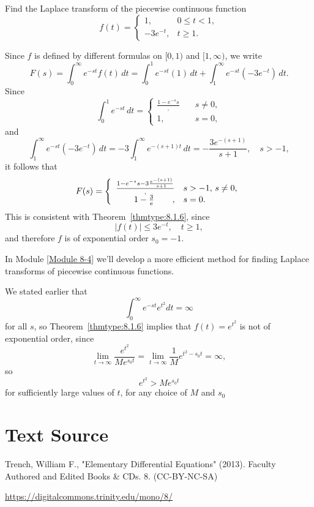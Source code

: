 \documentclass{ximera}
\begin{document}
\begin{example}\label{example:8.1.10}
Find the Laplace transform of the piecewise continuous function
$$
f(t)=\left\{\begin{array}{cl} 1,&0\leq t<1,\\  -3e^{-t},&t\geq
1.\end{array}\right.
$$
\begin{explanation}
Since $f$ is defined by different formulas
on $[0,1)$ and $[1,\infty)$, we write
$$
 F(s)=\int_0^\infty e^{-st} f(t)\,dt
=\int_0^1e^{-st}(1)\,dt+\int_1^\infty
e^{-st}(-3e^{-t})\,dt.
$$
Since
$$
\int_0^1e^{-st}\,dt=\left\{\begin{array}{cl}\frac{{1-e^{-s}}{s}},&\quad s\neq 0,\\ 1,&\quad s=0,\end{array}\right.
$$
 and
$$
\int_1^\infty e^{-st}(-3e^{-t})\,dt=-3\int_1^\infty
e^{-(s+1)t}\,dt=-\frac{3e^{-(s+1)}}{s+1},\quad s>-1,
$$
it follows that
$$
F(s)=\left\{\begin{array}{rl}\frac{{1-e^{-s}}{s}-3\frac{e^{-(s+1)}}{s+1}},&s>-1,\,s\neq 0,\\\hfill{1-\frac{3}{e}}\hfill,&
s=0.\end{array}\right.
$$
This is consistent with Theorem~\ref{thmtype:8.1.6}, since
$$
|f(t)|\leq 3e^{-t},\quad  t\geq 1,
$$
and therefore $f$ is of exponential order $s_0=-1$.
\end{explanation}
\end{example}

\begin{remark}
In Module \ref{Module 8-4} %
we'll develop a more efficient
method for finding Laplace transforms of piecewise continuous functions.
\end{remark}

\begin{example}\label{example:8.1.11}
We stated  earlier that
$$
\int_0^\infty e^{-st} e^{t^2} dt=\infty
$$
for all $s$, so Theorem~\ref{thmtype:8.1.6} implies that $f(t)=e^{t^2}$
is not  of exponential order, since
$$
\lim_{t\rightarrow\infty} \frac{e^{t^2}}{Me^{s_0t}}=\lim_{t\rightarrow\infty} \frac{1}{M} e^{t^2-s_0t}=\infty,
$$
so
$$
e^{t^2}>Me^{s_0t}
$$
for sufficiently large values of $t$, for any choice of $M$ and $s_{0}$
\end{example}


\section*{Text Source}
Trench, William F., "Elementary Differential Equations" (2013). Faculty Authored and Edited Books \& CDs. 8. (CC-BY-NC-SA)

\href{https://digitalcommons.trinity.edu/mono/8/}{https://digitalcommons.trinity.edu/mono/8/}
\end{document}
